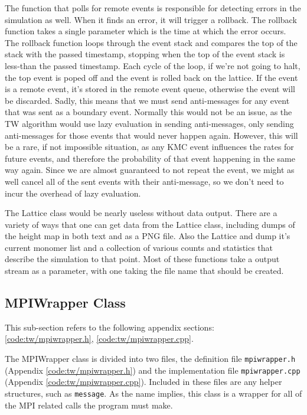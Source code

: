 The function that polls for remote events is responsible for detecting errors in the simulation as well.  When it finds an error, it will trigger a rollback.  The rollback function takes a single parameter which is the time at which the error occurs.  The rollback function loops through the event stack and compares the top of the stack with the passed timestamp, stopping when the top of the event stack is less-than the passed timestamp.  Each cycle of the loop, if we're not going to halt, the top event is poped off and the event is rolled back on the lattice.  If the event is a remote event, it's stored in the remote event queue, otherwise the event will be discarded.  Sadly, this means that we must send anti-messages for any event that was sent as a boundary event.  Normally this would not be an issue, as the TW algorithm would use lazy evaluation in sending anti-messages, only sending anti-messages for those events that would never happen again.  However, this will be a rare, if not impossible situation, as any KMC event influences the rates for future events, and therefore the probability of that event happening in the same way again.  Since we are almost guaranteed to not repeat the event, we might as well cancel all of the sent events with their anti-message, so we don't need to incur the overhead of lazy evaluation.

The Lattice class would be nearly useless without data output.  There are a variety of ways that one can get data from the Lattice class, including dumps of the height map in both text and as a PNG file.  Also the Lattice and dump it's current monomer list and a collection of various counts and statistics that describe the simulation to that point.  Most of these functions take a output stream as a parameter, with one taking the file name that should be created.

\subsection{MPIWrapper Class} \label{subsection:MPIWrapper Class}
This sub-section refers to the following appendix sections: \ref{code:tw/mpiwrapper.h}, \ref{code:tw/mpiwrapper.cpp}.

The MPIWrapper class is divided into two files, the definition file \texttt{mpiwrapper.h} (Appendix \ref{code:tw/mpiwrapper.h}) and the implementation file \texttt{mpiwrapper.cpp} (Appendix \ref{code:tw/mpiwrapper.cpp}).  Included in these files are any helper structures, such as \texttt{message}.  As the name implies, this class is a wrapper for all of the MPI related calls the program must make.

